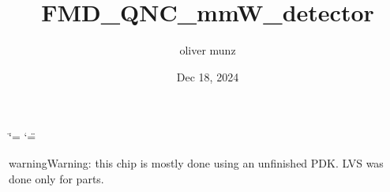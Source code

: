\documentclass[letterpaper,10pt,english]{sphinxmanual}
\title{FMD\_QNC\_mmW\_detector}
\date{Dec 18, 2024}
\author{oliver munz}
\begin{document}
\ifdefined\shorthandoff
  \ifnum\catcode`\=\string=\active\shorthandoff{=}\fi
  \ifnum\catcode`\"=\active{}\fi
\fi

\pagestyle{empty}
\sphinxmaketitle
\pagestyle{plain}
\sphinxtableofcontents
\pagestyle{normal}
\label{\detokenize{index::doc}}


\begin{sphinxadmonition}{warning}{Warning:}
\sphinxAtStartPar
this chip is mostly done using an unfinished PDK. LVS was done only for parts.
\end{sphinxadmonition}


\sphinxAtStartPar


\sphinxstepscope
\end{document}
